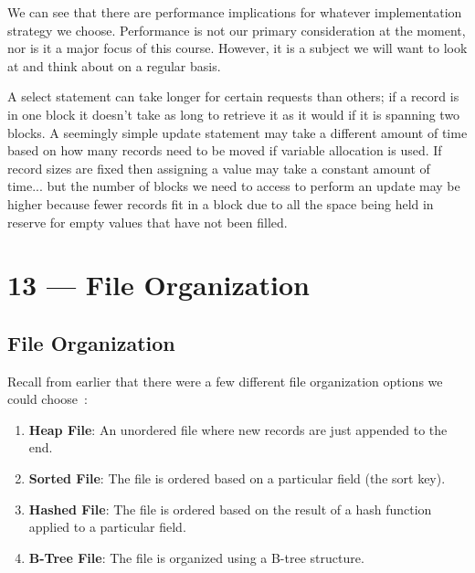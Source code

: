 \documentclass[a4paper]{report}
\begin{document}
We can see that there are performance implications for whatever implementation strategy we choose. Performance is not our primary consideration at the moment, nor is it a major focus of this course. However, it is a subject we will want to look at and think about on a regular basis. 

 A select statement can take longer for certain requests than others; if a record is in one block it doesn't take as long to retrieve it as it would if it is spanning two blocks. A seemingly simple update statement may take a different amount of time based on how many records need to be moved if variable allocation is used. If record sizes are fixed then assigning a value may take a constant amount of time... but the number of blocks we need to access to perform an update may be higher because fewer records fit in a block due to all the space being held in reserve for empty values that have not been filled.












\chapter*{13 --- File Organization}


\section*{File Organization}

Recall from earlier that there were a few different file organization options we could choose~\cite{fds}:

\begin{enumerate}
	\item \textbf{Heap File}: An unordered file where new records are just appended to the end.
	\item \textbf{Sorted File}: The file is ordered based on a particular field (the sort key).
	\item \textbf{Hashed File}: The file is ordered based on the result of a hash function applied to a particular field.
	\item \textbf{B-Tree File}: The file is organized using a B-tree structure.
\end{enumerate}
\end{document}
